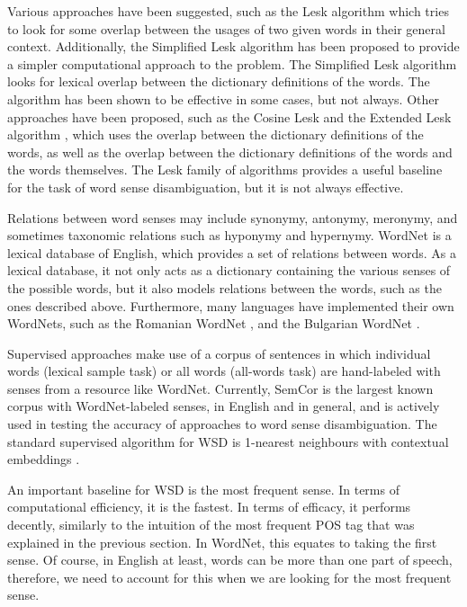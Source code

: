 Various approaches have been suggested, such as the Lesk algorithm \cite{10.1145/318723.318728} which tries to look for some overlap between the usages of two given words in their general context. Additionally, the Simplified Lesk algorithm has been proposed \citep{kilgarriff_framework_2000_lesk} to provide a simpler computational approach to the problem. The Simplified Lesk algorithm looks for lexical overlap between the dictionary definitions of the words. The algorithm has been shown to be effective in some cases, but not always. Other approaches have been proposed, such as the Cosine Lesk and the Extended Lesk algorithm \citep{banerjee2002extended}, which uses the overlap between the dictionary definitions of the words, as well as the overlap between the dictionary definitions of the words and the words themselves. The Lesk family of algorithms provides a useful baseline for the task of word sense disambiguation, but it is not always effective.

Relations between word senses may include synonymy, antonymy, meronymy, and sometimes taxonomic relations such as hyponymy and hypernymy. WordNet \citep{wordnet1998fellbaum,wordnet_princeton} is a lexical database of English, which provides a set of relations between words. As a lexical database, it not only acts as a dictionary containing the various senses of the possible words, but it also models relations between the words, such as the ones described above. Furthermore, many languages have implemented their own WordNets, such as the Romanian WordNet \citep{tufis2004wordnet}, and the Bulgarian WordNet \citep{dimitrova-etal-2014-coping}.

Supervised approaches make use of a corpus of sentences in which individual words (lexical sample task) or all words (all-words task) are hand-labeled with senses from a resource like WordNet. Currently, SemCor \citep{semcor} is the largest known corpus with WordNet-labeled senses, in English and in general, and is actively used in testing the accuracy of approaches to word sense disambiguation. The standard supervised algorithm for WSD is 1-nearest neighbours with contextual embeddings \citep{peters-etal-2018-deep_wsd,melamud2016context2vec_wsd}.

An important baseline for WSD is the most frequent sense. In terms of computational efficiency, it is the fastest. In terms of efficacy, it performs decently, similarly to the intuition of the most frequent POS tag that was explained in the previous section. In WordNet, this equates to taking the first sense. Of course, in English at least, words can be more than one part of speech, therefore, we need to account for this when we are looking for the most frequent sense. 


